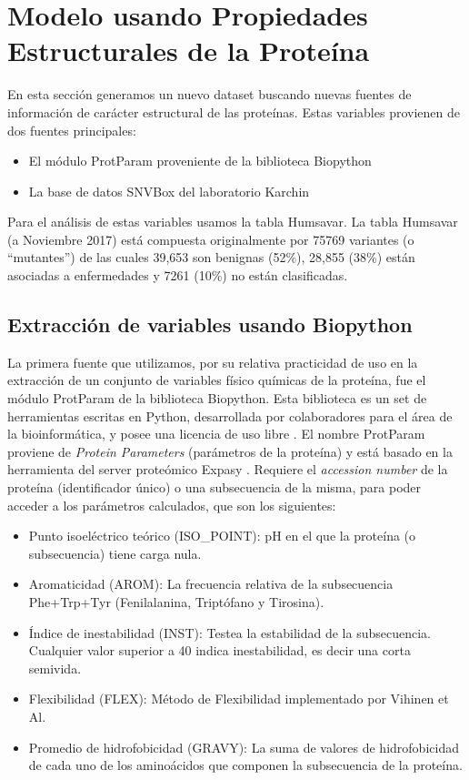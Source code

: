 \newpage

\section{Modelo usando Propiedades Estructurales de la Proteína}

En esta sección generamos un nuevo dataset buscando nuevas fuentes de información de carácter estructural de las proteínas. Estas variables provienen de dos fuentes principales:

\begin{itemize}
    \item El módulo ProtParam proveniente de la biblioteca Biopython
    \item La base de datos SNVBox del laboratorio Karchin
\end{itemize}

Para el análisis de estas variables usamos la tabla Humsavar. La tabla Humsavar (a Noviembre 2017) está compuesta originalmente por 75769 variantes (o ``mutantes'') de las cuales 39,653 son benignas (52\%), 28,855 (38\%) están asociadas a enfermedades y 7261 (10\%) no están clasificadas. 

\subsection{Extracción de variables usando Biopython}

La primera fuente que utilizamos, por su relativa practicidad de uso en la extracción de un conjunto de variables físico químicas de la proteína, fue el módulo ProtParam de la biblioteca Biopython. Esta biblioteca es un set de herramientas escritas en Python, desarrollada por colaboradores para el área de la bioinformática, y posee una licencia de uso libre \todo{[ref]}.
El nombre ProtParam proviene de \textit{Protein Parameters} (parámetros de la proteína) y está basado en la herramienta del server proteómico Expasy \todo{[ref]}. Requiere el \textit{accession number} de la proteína (identificador único) o una subsecuencia de la misma, para poder acceder a los parámetros calculados, que son los siguientes:

\begin{itemize}
    \item Punto isoeléctrico teórico (ISO\_POINT): pH en el que la proteína (o subsecuencia) tiene carga nula. 
    \item Aromaticidad (AROM): La frecuencia relativa de la subsecuencia Phe+Trp+Tyr (Fenilalanina, Triptófano y Tirosina). 
    \item Índice de inestabilidad (INST): Testea la estabilidad de la subsecuencia. Cualquier valor superior a 40 indica inestabilidad, es decir una corta semivida.  
    \item Flexibilidad (FLEX): Método de Flexibilidad implementado por Vihinen et Al.  
    \item Promedio de hidrofobicidad (GRAVY): La suma de valores de hidrofobicidad de cada uno de los aminoácidos que componen la subsecuencia de la proteína.
\end{itemize}

